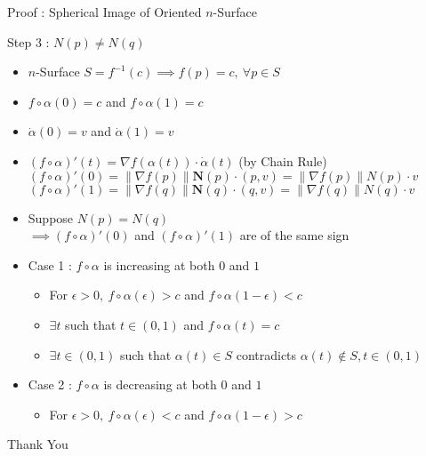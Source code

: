 \documentclass{beamer}
\begin{document}
\begin{frame}{Proof : Spherical Image of Oriented $n$-Surface}
\begin{block}{Step 3 : $N(p) \ne N(q)$}
\begin{itemize}
	\item $n$-Surface $S = f^{-1}(c) \implies f(p) = c,\ \forall p \in S$
	\item $f \circ \alpha (0) = c$ and $f \circ \alpha (1) = c$
	\item $\dot{\alpha}(0) = v$ and $\dot{\alpha}(1) = v$
	\item {\color{blue}$(f \circ \alpha)'(t) = \nabla f(\alpha(t)) \cdot \dot{\alpha}(t)$} (by Chain Rule)\\
	$(f \circ \alpha)'(0) = \|\nabla f(p)\| \mathbf{N}(p) \cdot (p,v) = \| \nabla f(p) \| N(p) \cdot v$\\
	$(f \circ \alpha)'(1) = \|\nabla f(q)\| \mathbf{N}(q) \cdot (q,v) = \| \nabla f(q) \| N(q) \cdot v$
\item Suppose $N(p) = N(q)$\\
	$\implies (f \circ \alpha)'(0)$ and $(f \circ \alpha)'(1) $ are of the same sign
	\item Case 1 : $f \circ \alpha$ is increasing at both $0$ and $1$
	\begin{itemize}
		\item For $\epsilon > 0,\ f \circ \alpha(\epsilon) > c$ and $f \circ \alpha (1-\epsilon) < c$
		\item $\exists t$ such that $t \in (0,1)$ and $f \circ \alpha(t) = c$
		\item $\exists t \in (0,1)$ such that $\alpha(t) \in S$ {\color{red} contradicts $\alpha(t) \notin S,t \in (0,1)$}
	\end{itemize}
	\item Case 2 : $f \circ \alpha$ is decreasing at both $0$ and $1$
	\begin{itemize}
		\item For $\epsilon > 0,\ f \circ \alpha(\epsilon) < c$ and $f \circ \alpha (1-\epsilon) > c$
	\end{itemize}
\end{itemize}
\end{block}
\end{frame}

\begin{frame}
	\vspace{0.6in}
	\hspace{3cm} {\color{blue}\Huge{Thank You}}
\end{frame}
\end{document}
